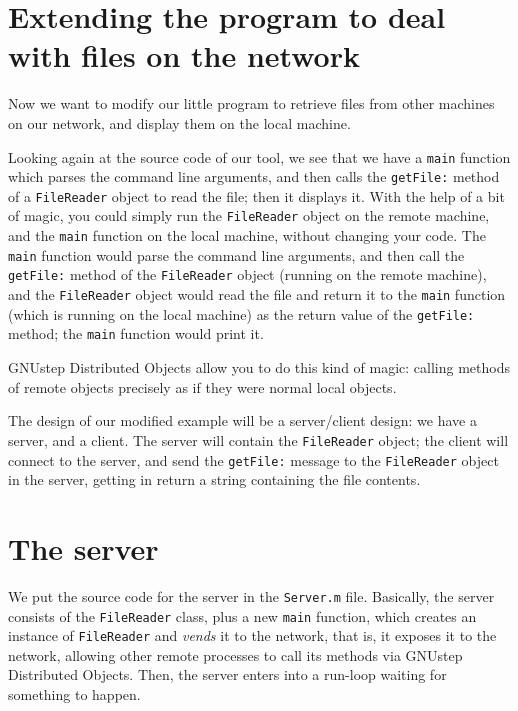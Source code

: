 \documentclass[a4paper]{article}
\begin{document}
\section{Extending the program to deal with files on the network}

Now we want to modify our little program to retrieve files from other
machines on our network, and display them on the local machine.

Looking again at the source code of our tool, we see that we have a
\texttt{main} function which parses the command line arguments, and
then calls the \texttt{getFile:} method of a \texttt{FileReader}
object to read the file; then it displays it.  With the help of a bit
of magic, you could simply run the \texttt{FileReader} object on the
remote machine, and the \texttt{main} function on the local machine,
without changing your code.  The \texttt{main} function would parse
the command line arguments, and then call the \texttt{getFile:} method
of the \texttt{FileReader} object (running on the remote machine), and
the \texttt{FileReader} object would read the file and return it to
the \texttt{main} function (which is running on the local machine) as
the return value of the \texttt{getFile:} method; the \texttt{main}
function would print it.

GNUstep Distributed Objects allow you to do this kind of magic:
calling methods of remote objects precisely as if they were normal
local objects.

The design of our modified example will be a server/client design: we
have a server, and a client.  The server will contain the
\texttt{FileReader} object; the client will connect to the server, and
send the \texttt{getFile:} message to the \texttt{FileReader} object
in the server, getting in return a string containing the file
contents.

\section{The server}
We put the source code for the server in the \texttt{Server.m} file.
Basically, the server consists of the \texttt{FileReader} class, plus
a new \texttt{main} function, which creates an instance of
\texttt{FileReader} and {\it vends} it to the network, that is, it
exposes it to the network, allowing other remote processes to call its
methods via GNUstep Distributed Objects.  Then, the server enters into
a run-loop waiting for something to happen.
\end{document}
